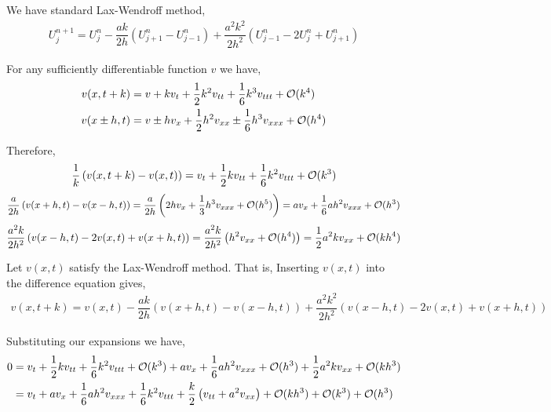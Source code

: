 \documentclass[10pt]{article}
\begin{document}
\begin{solution}[Solution]

We have standard Lax-Wendroff method,
\begin{align*}
    U_j^{n+1} = U_j^n -\dfrac{ak}{2h} \left( U_{j+1}^n-U_{j-1}^n \right) + \dfrac{a^2k^2}{2h^2} \left( U_{j-1}^n - 2U_j^n + U_{j+1}^n \right)
\end{align*}

For any sufficiently differentiable function \( v \) we have,
\begin{align*}
    v(x,t+k) &= v + k v_t + \dfrac{1}{2}k^2 v_{tt} + \dfrac{1}{6}k^3 v_{ttt} + \cO(k^4) \\
    v(x\pm h,t) &= v \pm hv_x + \dfrac{1}{2}h^2 v_{xx} \pm \dfrac{1}{6}h^3 v_{xxx} + \cO(h^4) %
\end{align*}

Therefore,
\begin{align*}
    \dfrac{1}{k} \left( v(x,t+k) - v(x,t) \right) = v_t + \dfrac{1}{2}kv_{tt} + \dfrac{1}{6}k^2 v_{ttt} + \mathcal{O}(k^3)
\end{align*}
\begin{align*}
    \dfrac{a}{2h}\left( v(x+h,t)-v(x-h,t) \right) =  \dfrac{a}{2h} \left( 2hv_x + \dfrac{1}{3}h^3 v_{xxx} + \mathcal{O}(h^5) \right)
    = av_x + \dfrac{1}{6}ah^2 v_{xxx} + \mathcal{O}(h^3)
\end{align*}
\begin{align*}
    \dfrac{a^2k}{2h^2}\left(v(x-h,t)-2v(x,t)+v(x+h,t) \right)
    =  \dfrac{a^2k}{2h^2}\left( h^2v_{xx} + \mathcal{O}(h^4) \right)
    = \dfrac{1}{2}a^2 k v_{xx} + \mathcal{O}(kh^4)
\end{align*}


Let \( v(x,t) \) satisfy the Lax-Wendroff method. That is,
Inserting \( v(x,t) \) into the difference equation gives,
\begin{align*}
    v(x,t+k) = v(x,t) - \dfrac{ak}{2h} \left( v(x+h,t) - v(x-h,t) \right) + \dfrac{a^2k^2}{2h^2} \left( v(x-h,t)-2v(x,t)+v(x+h,t) \right)
\end{align*}

Substituting our expansions we have,
\begin{align*}
    0 & = v_t + \dfrac{1}{2}k v_{tt} + \dfrac{1}{6}k^2v_{ttt} +\mathcal{O}(k^3) + av_x + \dfrac{1}{6}ah^2 v_{xxx} + \mathcal{O}(h^3) + \dfrac{1}{2}a^2kv_{xx} + \mathcal{O}(kh^3) \\
    &= v_t + av_x + \dfrac{1}{6}ah^2 v_{xxx} + \dfrac{1}{6}k^2v_{ttt} + \dfrac{k}{2} \left( v_{tt} + a^2v_{xx} \right) +  \mathcal{O}(kh^3) + \mathcal{O}(k^3) + \mathcal{O}(h^3)
\end{align*}


\end{solution}
\end{document}
